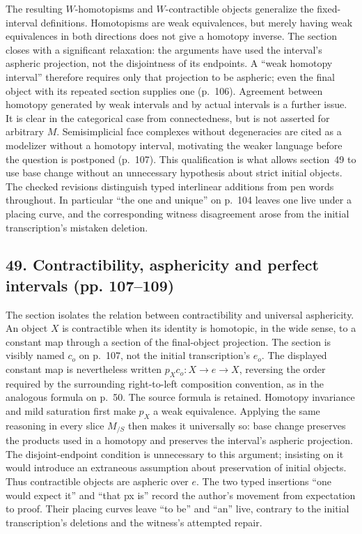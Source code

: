 The resulting $W$-homotopisms and $W$-contractible objects generalize the fixed-interval definitions. Homotopisms are weak equivalences, but merely having weak equivalences in both directions does not give a homotopy inverse. The section closes with a significant relaxation: the arguments have used the interval's aspheric projection, not the disjointness of its endpoints. A ``weak homotopy interval'' therefore requires only that projection to be aspheric; even the final object with its repeated section supplies one (p.~106). Agreement between homotopy generated by weak intervals and by actual intervals is a further issue. It is clear in the categorical case from connectedness, but is not asserted for arbitrary $M$. Semisimplicial face complexes without degeneracies are cited as a modelizer without a homotopy interval, motivating the weaker language before the question is postponed (p.~107). This qualification is what allows section~49 to use base change without an unnecessary hypothesis about strict initial objects. The checked revisions distinguish typed interlinear additions from pen words throughout. In particular ``the one and unique'' on p.~104 leaves one live under a placing curve, and the corresponding witness disagreement arose from the initial transcription's mistaken deletion.

\subsection*{49. Contractibility, asphericity and perfect intervals (pp. 107--109)}
The section isolates the relation between contractibility and universal asphericity. An object $X$ is contractible when its identity is homotopic, in the wide sense, to a constant map through a section of the final-object projection. The section is visibly named $c_o$ on p.~107, not the initial transcription's $e_o$. The displayed constant map is nevertheless written $p_Xc_o:X\to e\to X$, reversing the order required by the surrounding right-to-left composition convention, as in the analogous formula on p.~50. The source formula is retained. Homotopy invariance and mild saturation first make $p_X$ a weak equivalence. Applying the same reasoning in every slice $M_{/S}$ then makes it universally so: base change preserves the products used in a homotopy and preserves the interval's aspheric projection. The disjoint-endpoint condition is unnecessary to this argument; insisting on it would introduce an extraneous assumption about preservation of initial objects. Thus contractible objects are aspheric over $e$. The two typed insertions ``one would expect it'' and ``that px is'' record the author's movement from expectation to proof. Their placing curves leave ``to be'' and ``an'' live, contrary to the initial transcription's deletions and the witness's attempted repair.

